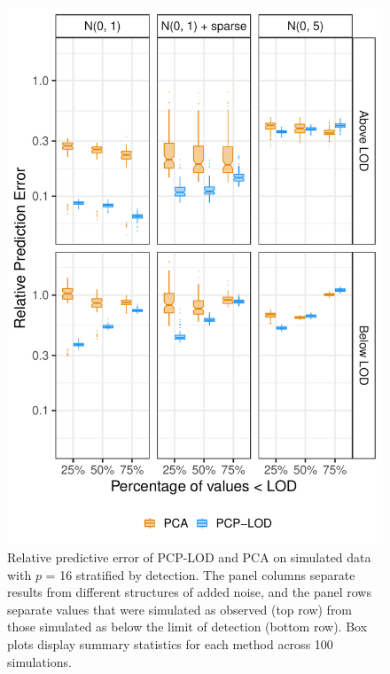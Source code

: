 \begin{figure}
    \centering
\includegraphics[width=.75\textwidth]{figures/lod_boxplots_16.pdf}
   \caption[Stratified relative prediction error of PCP-LOD and PCA ($p$ = 16)]{Relative predictive error of PCP-LOD and PCA on simulated data with $p$ = 16 stratified by detection. The panel columns separate results from different structures of added noise, and the panel rows separate values that were simulated as observed (top row) from those simulated as below the limit of detection (bottom row). Box plots display summary statistics for each method across 100 simulations.}
    \label{fig:above_below}
\end{figure}

